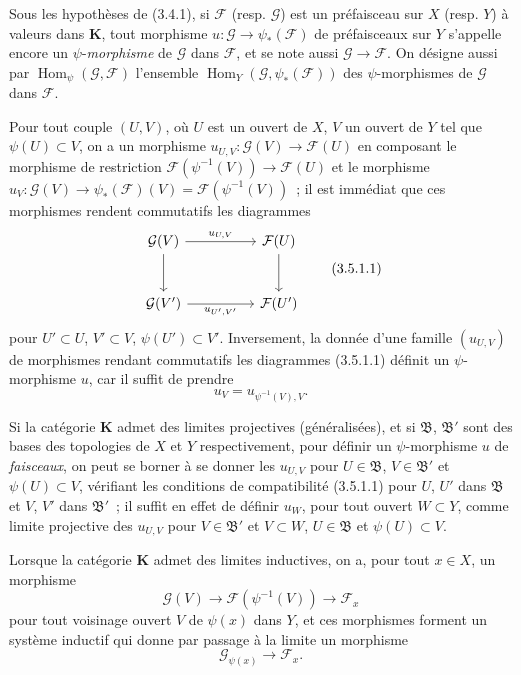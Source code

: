\begin{env}[3.5.1]
\label{0.3.5.1-fr}
Sous les hypothèses de (3.4.1), si $\mathcal{F}$ (resp. $\mathcal{G}$) est un
préfaisceau sur $X$ (resp. $Y$) à valeurs dans $\mathbf{K}$, tout morphisme
$u:\mathcal{G}\to\psi_*(\mathcal{F})$ de préfaisceaux sur $Y$ s'appelle encore
un $\psi$-\emph{morphisme} de $\mathcal{G}$ dans $\mathcal{F}$, et se note
aussi $\mathcal{G}\to\mathcal{F}$. On désigne aussi par
$\operatorname{Hom}_\psi(\mathcal{G},\mathcal{F})$ l'ensemble
$\operatorname{Hom}_Y(\mathcal{G},\psi_*(\mathcal{F}))$ des
$\psi$-morphismes de $\mathcal{G}$ dans $\mathcal{F}$.

Pour tout couple $(U,V)$, où $U$ est un ouvert de $X$, $V$ un ouvert de $Y$
tel que $\psi(U)\subset V$, on a un morphisme
$u_{U,V}:\mathcal{G}(V)\to\mathcal{F}(U)$ en composant le morphisme de
restriction
$\mathcal{F}(\psi^{-1}(V))\to\mathcal{F}(U)$ et le morphisme
$u_V:\mathcal{G}(V)\to\psi_*(\mathcal{F})(V)=\mathcal{F}(\psi^{-1}(V))$~; il
est immédiat que ces morphismes rendent commutatifs les diagrammes
\begin{equation*}
\begin{tikzcd}[column sep=huge,row sep=large]
\mathcal{G}(V) \arrow[r,"u_{U,V}"] \arrow[d]
  & \mathcal{F}(U) \arrow[d] \\
\mathcal{G}(V') \arrow[r,"u_{U',V'}"']
  & \mathcal{F}(U')
\end{tikzcd}
\tag{3.5.1.1}\label{0.3.5.1.1-fr}
\end{equation*}
pour $U'\subset U$, $V'\subset V$, $\psi(U')\subset V'$. Inversement, la
donnée d'une famille $(u_{U,V})$ de morphismes rendant commutatifs les
diagrammes (3.5.1.1) définit un $\psi$-morphisme $u$, car il suffit de prendre
\[
  u_V=u_{\psi^{-1}(V),V}.
\]


Si la catégorie $\mathbf{K}$ admet des limites projectives (généralisées), et
si $\mathfrak{B}$, $\mathfrak{B}'$ sont des bases des topologies de $X$ et
$Y$ respectivement, pour définir un $\psi$-morphisme $u$ de \emph{faisceaux},
on peut se borner à se donner les $u_{U,V}$ pour
$U\in\mathfrak{B}$, $V\in\mathfrak{B}'$ et $\psi(U)\subset V$, vérifiant les
conditions de compatibilité (3.5.1.1) pour $U$, $U'$ dans $\mathfrak{B}$ et
$V$, $V'$ dans $\mathfrak{B}'$~; il suffit en effet de définir $u_W$, pour
tout ouvert $W\subset Y$, comme limite projective des $u_{U,V}$ pour
$V\in\mathfrak{B}'$ et $V\subset W$, $U\in\mathfrak{B}$ et
$\psi(U)\subset V$.

Lorsque la catégorie $\mathbf{K}$ admet des limites inductives, on a, pour
tout $x\in X$, un morphisme
\[
  \mathcal{G}(V)\to\mathcal{F}(\psi^{-1}(V))\to\mathcal{F}_x
\]
pour tout voisinage ouvert $V$ de $\psi(x)$ dans $Y$, et ces morphismes
forment un système inductif qui donne par passage à la limite un morphisme
\[
  \mathcal{G}_{\psi(x)}\to\mathcal{F}_x.
\]
\end{env}

